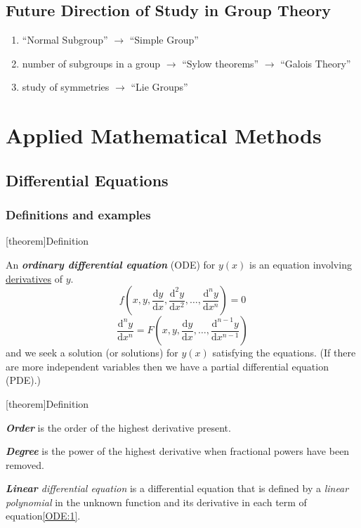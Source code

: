 \documentclass[12pt]{report}
\theoremstyle{definition}
\begin{document}
\section{Future Direction of Study in Group Theory}

\begin{enumerate}
    \item ``Normal Subgroup'' $\rightarrow$ ``Simple Group''
    \item number of subgroups in a group $\rightarrow$ ``Sylow theorems''
        $\rightarrow$ ``Galois Theory''
    \item study of symmetries $\rightarrow$ ``Lie Groups''
\end{enumerate}



\chapter{Applied Mathematical Methods}

\section{Differential Equations}

\subsection{Definitions and examples}

[theorem]{Definition}
\begin{ODE}
    An \textbf{\emph{ordinary differential equation}} (ODE) for $y (x)$
    is an equation involving \underline{derivatives} of $y$.
    \begin{equation}\label{ODE:1}
        f(x, y, \frac{\mathrm{d} y}{\mathrm{d}x}, \frac{\mathrm{d}^{2} y}{\mathrm{d}x^{2}}, \ldots,
        \frac{\mathrm{d}^{n} y}{\mathrm{d}x^{n}}) = 0
        \end{equation}
    \[
        \frac{\mathrm{d}^{n} y}{\mathrm{d}x^{n}} = 
        F(x, y, \frac{\mathrm{d} y}{\mathrm{d}x}, \ldots, \frac{\mathrm{d}^{n-1} y}{\mathrm{d}x^{n-1}})
    \]
    and we seek a solution (or solutions) for $y(x)$ satisfying the equations.
    (If there are more independent variables then we have a partial differential equation (PDE).)
\end{ODE}

[theorem]{Definition}
\begin{order and power}
    \;

    \textbf{\emph{Order}} is the order of the highest derivative present.

    \textbf{\emph{Degree}} is the power of the highest derivative when fractional powers have been removed.

    \emph{\textbf{Linear} differential equation} is a differential equation that is defined by a \emph{linear polynomial}
    in the unknown function and its derivative in each term of equation\eqref{ODE:1}.
\end{order and power}
\end{document}
